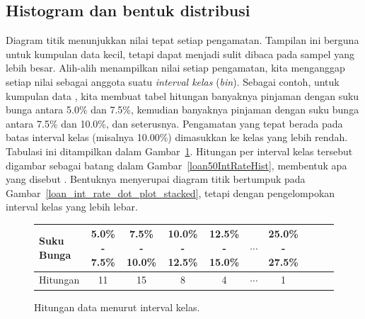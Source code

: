 


\subsection{Histogram dan bentuk distribusi}
\label{histogramsAndShape}

Diagram titik menunjukkan nilai tepat setiap pengamatan.
Tampilan ini berguna untuk kumpulan data kecil, tetapi dapat
menjadi sulit dibaca pada sampel yang lebih besar. Alih-alih
menampilkan nilai setiap pengamatan, kita menganggap setiap nilai
sebagai anggota suatu \emph{interval kelas} (\emph{bin}).
Sebagai contoh, untuk kumpulan data , kita membuat
tabel hitungan banyaknya pinjaman dengan suku bunga antara 5.0\%
dan 7.5\%, kemudian banyaknya pinjaman dengan suku bunga antara
7.5\% dan 10.0\%, dan seterusnya.
Pengamatan yang tepat berada pada batas interval kelas
(misalnya 10.00\%) dimasukkan ke kelas yang lebih rendah.
Tabulasi ini ditampilkan dalam Gambar~\ref{binnedIntRateAmountTable}.
Hitungan per interval kelas tersebut digambar sebagai batang dalam
Gambar~\ref{loan50IntRateHist}, membentuk apa yang disebut
. Bentuknya menyerupai diagram titik bertumpuk pada
Gambar~\ref{loan_int_rate_dot_plot_stacked}, tetapi dengan
pengelompokan interval kelas yang lebih lebar.

\begin{figure}[ht]
\centering\small
\begin{tabular}{l ccc ccc ccc}
  \hline
  Suku Bunga &
      5.0\% - 7.5\% &
      7.5\% - 10.0\% &
      10.0\% - 12.5\% &
      12.5\% - 15.0\% &
      $\cdots$ &
      25.0\% - 27.5\% \\
  \hline
  Hitungan & 11 & 15 & 8 & 4 & $\cdots$ & 1 \\
  \hline
\end{tabular}
\caption{Hitungan data 
    menurut interval kelas.}
\label{binnedIntRateAmountTable}
\end{figure}

